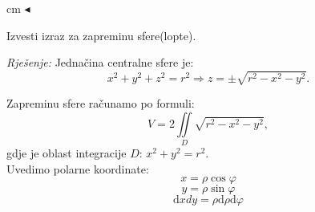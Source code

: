 \documentclass[a4paper,11pt]{article}
\begin{document}
 cm $\blacktriangleleft$ \\
 \begin{tcolorbox}[colback=brown!35!white,colframe=white!75!white,title= $$\bullet \bullet \bullet$$]
         \begin{zadatak}
Izvesti izraz za zapreminu sfere(lopte).
\end{zadatak}
\end{tcolorbox}
\emph{Rješenje: }
Jednačina centralne sfere je: 
$$x^2 + y^2 + z^2 = r^2 \Rightarrow z = \pm \sqrt{r^{2} - x^2 - y^2 } .$$

\begin{center}
\end{center}
Zapreminu sfere računamo po formuli:
$$V = 2\iint \limits_D \sqrt{r^{2} - x^2 - y^2 },$$
gdje je oblast integracije $D$: $x^2 + y^2 = r^2.$\\
Uvedimo polarne koordinate:
$$x = \rho \cos{\varphi}$$
$$y = \rho \sin{\varphi}$$
 $$\mathrm dxdy = \rho  \mathrm d \rho  \mathrm d\varphi$$
 
\end{document}
